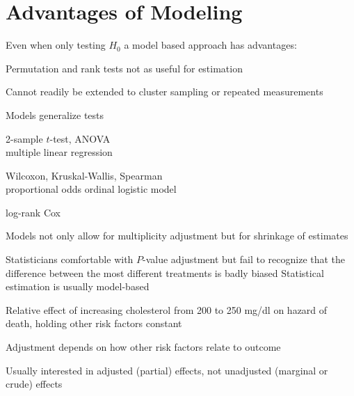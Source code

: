 \section{Advantages of Modeling}
Even when only testing $H_{0}$ a model based approach has advantages:
\bi
\item   Permutation and rank tests not as useful for estimation
\item   Cannot readily be extended to cluster sampling or repeated measurements
\item   Models generalize tests
    \bi
    \item   2-sample $t$-test, ANOVA \ra \\ multiple linear regression
    \item   Wilcoxon, Kruskal-Wallis, Spearman \ra \\ proportional odds
            ordinal logistic model
    \item   log-rank \ra Cox
    \ei
\item   Models not only allow for multiplicity adjustment but for
        shrinkage of estimates
    \bi
    \item   Statisticians comfortable with $P$-value adjustment
            but fail to recognize that the difference between the most
            different treatments is badly biased
    \ei
\ei
Statistical estimation is usually model-based
\bi
\item   Relative effect of increasing cholesterol from 200 to 250
        mg/dl on hazard of death, holding other risk factors constant
\item   Adjustment depends on how other risk factors relate to outcome
\item Usually interested in adjusted (partial) effects, not unadjusted
  (marginal or crude) effects
\ei

